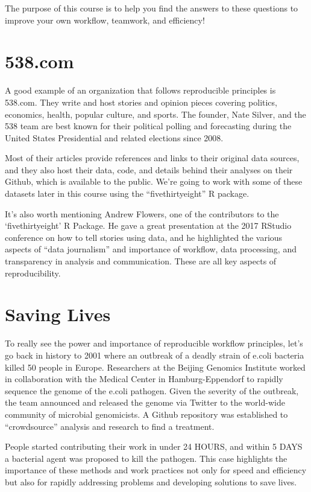 \documentclass[
]{book}
\begin{document}
The purpose of this course is to help you find the answers to these questions to improve your own workflow, teamwork, and efficiency!

\hypertarget{com}{%
\section{538.com}\label{com}}

A good example of an organization that follows reproducible principles is 538.com. They write and host stories and opinion pieces covering politics, economics, health, popular culture, and sports. The founder, Nate Silver, and the 538 team are best known for their political polling and forecasting during the United States Presidential and related elections since 2008.

Most of their articles provide references and links to their original data sources, and they also host their data, code, and details behind their analyses on their Github, which is available to the public. We're going to work with some of these datasets later in this course using the ``fivethirtyeight'' R package.

It's also worth mentioning Andrew Flowers, one of the contributors to the `fivethirtyeight' R Package. He gave a great presentation at the 2017 RStudio conference on how to tell stories using data, and he highlighted the various aspects of ``data journalism'' and importance of workflow, data processing, and transparency in analysis and communication. These are all key aspects of reproducibility.

\hypertarget{saving-lives}{%
\section{Saving Lives}\label{saving-lives}}

To really see the power and importance of reproducible workflow principles, let's go back in history to 2001 where an outbreak of a deadly strain of e.coli bacteria killed 50 people in Europe. Researchers at the Beijing Genomics Institute worked in collaboration with the Medical Center in Hamburg-Eppendorf to rapidly sequence the genome of the e.coli pathogen. Given the severity of the outbreak, the team announced and released the genome via Twitter to the world-wide community of microbial genomicists. A Github repository was established to ``crowdsource'' analysis and research to find a treatment.

People started contributing their work in under 24 HOURS, and within 5 DAYS a bacterial agent was proposed to kill the pathogen. This case highlights the importance of these methods and work practices not only for speed and efficiency but also for rapidly addressing problems and developing solutions to save lives.
\end{document}
